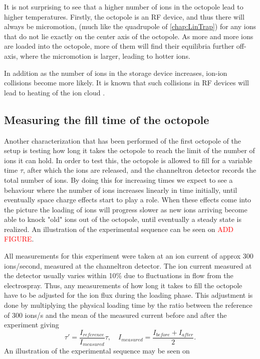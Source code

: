 It is not surprising to see that a higher number of ions in the octopole lead to higher temperatures. Firstly, the octopole is an RF device, and thus there will always be micromotion,
 (much like the quadrupole of \cref{chap:LinTrap}) for any ions that do not lie exactly on the center axis of the octopole. 
As more and more ions are loaded into the octopole, more of them will find their equilibria further off-axis, where the micromotion is larger, leading to hotter ions.

In addition as the number of ions in the storage device increases, ion-ion collisions become more likely. It is known that such collisions in RF devices will lead to heating of the ion cloud \cite{BlumelHeating,MichaelIonIonHeating}.


\subsection{Measuring the fill time of the octopole}
Another characterization that has been performed of the first octopole of the setup is testing how long it takes the octopole to reach the limit of the number of ions it can hold.
In order to test this, the octopole is allowed to fill for a variable time $\tau$, after which the ions are released, and the channeltron detector records the total number of ions.
By doing this for increasing times we expect to see a behaviour where the number of ions increases linearly in time initially, until eventually space charge effects start to play a role.
When these effects come into the picture the loading of ions will progress slower as new ions arriving become able to knock "old" ions out of the octopole, until eventually a steady state is realized.
An illustration of the experimental sequence can be seen on \textcolor{red}{ADD FIGURE}. 


All measurements for this experiment were taken at an ion current of approx 300 ions/second, measured at the channeltron detector.
The ion current measured at the detector usually varies within 10\% due to fluctuations in flow from the electrospray. Thus, any measurements of how long it takes to fill the octopole have to be adjusted for the ion flux during the loading phase.  This adjustment is done by multiplying the physical loading time by the ratio between the reference of 300 ions/s and the mean of the measured current before and after the experiment giving
\begin{equation}
    \tau'= \frac{I_{reference}}{I_{measured}}\tau,\quad I_{measured} = \frac{I_{before}+I_{after}}{2}.
\end{equation}
An illustration of the experimental sequence may be seen on 